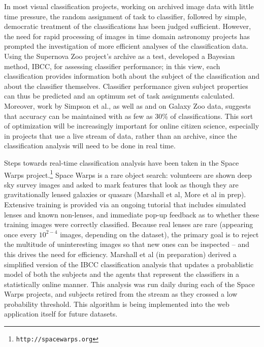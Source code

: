 \documentclass{ar2e}
\def\CaseStudy#1{\noindent{\it\bf #1 \,\,\,\,}}
\def\url#1{\texttt{#1}}
\begin{document}
In most visual classification projects, working on archived image data with
little time pressure, the random assignment of task to classifier, followed by
simple, democratic treatment of the classifications has been judged sufficient.
However, the need for rapid processing of images in time domain astronomy
projects has prompted the investigation of more efficient analyses of the
classification data.  Using the Supernova Zoo project's archive as a test,
\citet{Simpson++2012IBCC} developed a Bayesian method, IBCC, for assessing
classifier performance; in this view, each classification provides information
both about the subject of the classification and about the classifier
themselves. Classifier performance given subject properties can thus be
predicted and an optimum set of task assignments calculated. 
Moreover, work by Simpson et al., as well as \citet{Kamar} and \citet{Waterhouse} on
Galaxy Zoo data, suggests that accuracy can be maintained with as few as 30\% of
classifications. 
This sort of optimization will be increasingly important for online citizen
science, especially in projects that use a live stream of data, rather than
an archive, since the classification analysis will need to be done in real time.



\CaseStudy{Rare event detection: Space Warps} 
Steps towards real-time classification analysis have been taken in the Space
Warps project.\footnote{\url{http://spacewarps.org}} 
Space Warps is a rare object search: volunteers are shown deep
sky survey images and asked to mark features that look as though they are
gravitationally lensed galaxies or quasars (Marshall et al, More et al in prep).
Extensive training is
provided via an ongoing tutorial that includes simulated lenses and known
non-lenses, and immediate pop-up feedback as to whether these training images
were correctly classified. Because real lenses are rare (appearing once every
$10^{2-4}$ images, depending on the dataset), the primary goal is to reject the
multitude of uninteresting images so that new ones can be inspected -- and this
drives the need for efficiency. Marshall et al (in preparation) derived a
simplified version of the IBCC classification analysis that updates a
probablistic model of both the subjects and the agents that represent the
classifiers in a statistically online manner. This
analysis was run daily during each of the Space Warps projects, and subjects
retired from the stream as they crossed a low probability threshold. This
algorithm is being implemented into the web application itself for future
datasets. 
\end{document}
